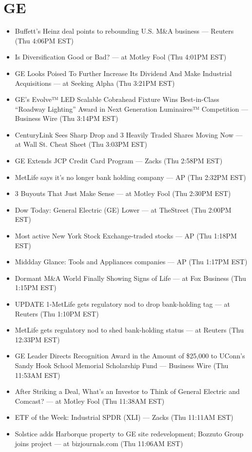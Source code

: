 \documentclass[11pt,asymmetric]{article}
\begin{document}
\section*{GE}
\begin{itemize}
\item Buffett's Heinz deal points to rebounding U.S. M\&A business --- Reuters (Thu 4:06PM EST)
\item Is Diversification Good or Bad? --- at Motley Fool (Thu 4:01PM EST)
\item GE Looks Poised To Further Increase Its Dividend And Make Industrial Acquisitions --- at Seeking Alpha (Thu 3:21PM EST)
\item GE’s Evolve™ LED Scalable Cobrahead Fixture Wins Best-in-Class “Roadway Lighting” Award in Next Generation Luminaires™ Competition --- Business Wire (Thu 3:14PM EST)
\item CenturyLink Sees Sharp Drop and 3 Heavily Traded Shares Moving Now --- at Wall St. Cheat Sheet (Thu 3:03PM EST)
\item GE Extends JCP Credit Card Program --- Zacks (Thu 2:58PM EST)
\item MetLife says it's no longer bank holding company --- AP (Thu 2:32PM EST)
\item 3 Buyouts That Just Make Sense --- at Motley Fool (Thu 2:30PM EST)
\item Dow Today: General Electric (GE) Lower --- at TheStreet (Thu 2:00PM EST)
\item Most active New York Stock Exchange-traded stocks --- AP (Thu 1:18PM EST)
\item Middday Glance: Tools and Appliances companies --- AP (Thu 1:17PM EST)
\item Dormant M\&A World Finally Showing Signs of Life --- at Fox Business (Thu 1:15PM EST)
\item UPDATE 1-MetLife gets regulatory nod to drop bank-holding tag --- at Reuters (Thu 1:10PM EST)
\item MetLife gets regulatory nod to shed bank-holding status --- at Reuters (Thu 12:33PM EST)
\item GE Leader Directs Recognition Award in the Amount of \$25,000 to UConn’s Sandy Hook School Memorial Scholarship Fund --- Business Wire (Thu 11:53AM EST)
\item After Striking a Deal, What's an Investor to Think of General Electric and Comcast? --- at Motley Fool (Thu 11:38AM EST)
\item ETF of the Week: Industrial SPDR (XLI) --- Zacks (Thu 11:11AM EST)
\item Solstice adds Harborque property to GE site redevelopment; Bozzuto Group joins project --- at bizjournals.com (Thu 11:06AM EST)

\end{itemize}
\end{document}
